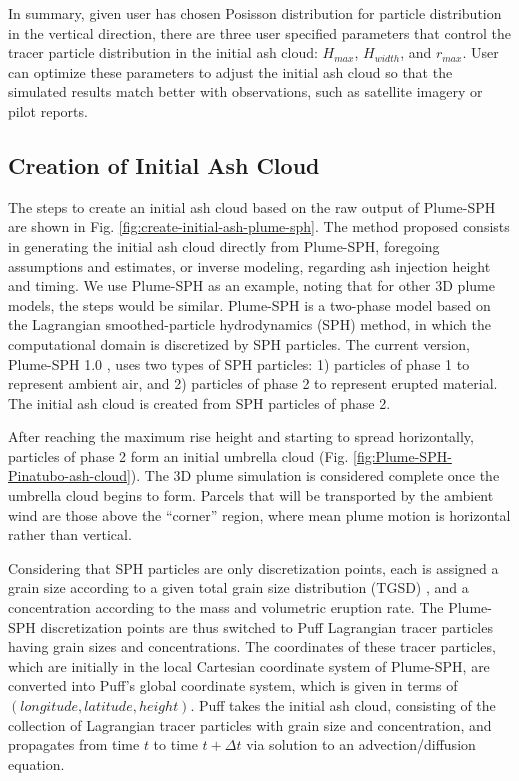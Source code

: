 \documentclass[utf8]{frontiersSCNS} %
\begin{document}
In summary, given user has chosen Posisson distribution for particle distribution in the vertical direction, there are three user specified parameters that control the tracer particle distribution in the initial ash cloud: $H_{max}$, $H_{width}$, and $r_{max}$. User can optimize these parameters to adjust the initial ash cloud so that the simulated results match better with observations, such as satellite imagery or pilot reports.

\subsection{Creation of Initial Ash Cloud} \label{sec:create-initial-condition}
The steps to create an initial ash cloud based on the raw output of Plume-SPH are shown in Fig. \ref{fig:create-initial-ash-plume-sph}.
The method proposed consists in generating the initial ash cloud directly from Plume-SPH, foregoing assumptions and estimates, or inverse modeling, regarding ash injection height and timing.
We use Plume-SPH as an example, noting that for other 3D plume models, the steps would be similar. Plume-SPH is a two-phase model based on the Lagrangian smoothed-particle hydrodynamics (SPH) method, in which the computational domain is discretized by SPH particles. The current version, Plume-SPH 1.0 \citep{cao2018plume}, uses two types of SPH particles: 1) particles of phase 1 to represent ambient air, and 2) particles of phase 2 to represent erupted material. The initial ash cloud is created from SPH particles of phase 2.

After reaching the maximum rise height and starting to spread horizontally, particles of phase 2 form an initial umbrella cloud (Fig. \ref{fig:Plume-SPH-Pinatubo-ash-cloud}). The 3D plume simulation is considered complete once the umbrella cloud begins to form. Parcels that will be transported by the ambient wind are those above the ``corner'' region, where mean plume motion is horizontal rather than vertical.

Considering that SPH particles are only discretization points, each is assigned a grain size according to a given total grain size distribution (TGSD) \citep{paladio1996tephra}, and a concentration according to the mass and volumetric eruption rate. The Plume-SPH discretization points are thus switched to Puff Lagrangian tracer particles having grain sizes and concentrations. The coordinates of these tracer particles, which are initially in the local Cartesian coordinate system of Plume-SPH, are converted into Puff's global coordinate system, which is given in terms of $(longitude, latitude, height)$. Puff takes the initial ash cloud, consisting of the collection of Lagrangian tracer particles with grain size and concentration, and propagates from time $t$ to time $t+\Delta t$ via solution to an advection/diffusion equation.
\end{document}

